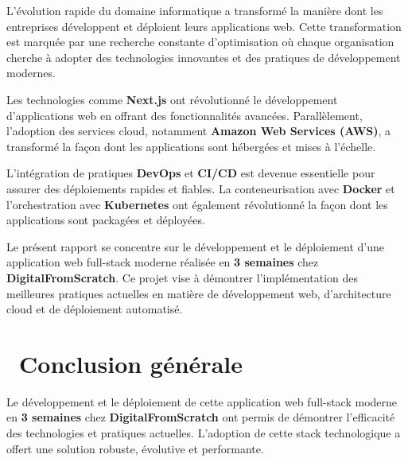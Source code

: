 \documentclass[12pt,a4paper]{report}
\begin{document}
L'évolution rapide du domaine informatique a transformé la manière dont les entreprises développent et déploient leurs applications web. Cette transformation est marquée par une recherche constante d'optimisation où chaque organisation cherche à adopter des technologies innovantes et des pratiques de développement modernes.

\begin{infobox}
Les technologies comme \textbf{Next.js} ont révolutionné le développement d'applications web en offrant des fonctionnalités avancées. Parallèlement, l'adoption des services cloud, notamment \textbf{Amazon Web Services (AWS)}, a transformé la façon dont les applications sont hébergées et mises à l'échelle.
\end{infobox}

L'intégration de pratiques \textcolor{accentgreen}{\textbf{DevOps}} et \textcolor{accentgreen}{\textbf{CI/CD}} est devenue essentielle pour assurer des déploiements rapides et fiables. La conteneurisation avec \textcolor{primaryblue}{\textbf{Docker}} et l'orchestration avec \textcolor{primaryblue}{\textbf{Kubernetes}} ont également révolutionné la façon dont les applications sont packagées et déployées.

\begin{warningbox}
Le présent rapport se concentre sur le développement et le déploiement d'une application web full-stack moderne réalisée en \textbf{3 semaines} chez \textbf{DigitalFromScratch}. Ce projet vise à démontrer l'implémentation des meilleures pratiques actuelles en matière de développement web, d'architecture cloud et de déploiement automatisé.
\end{warningbox}






\newpage
\chapter*{\color{primaryblue}\faFlagCheckered\ Conclusion générale}

Le développement et le déploiement de cette application web full-stack moderne en \textbf{\color{primaryblue}3 semaines} chez \textbf{\color{accentgreen}DigitalFromScratch} ont permis de démontrer l'efficacité des technologies et pratiques actuelles. L'adoption de cette stack technologique a offert une solution robuste, évolutive et performante.
\end{document}
